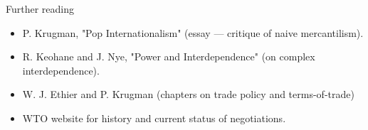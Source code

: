 \documentclass[notes,11pt, aspectratio=169, xcolor=table]{beamer}
\begin{document}
\begin{frame}{Further reading}
  \begin{itemize}
    \item P. Krugman, "Pop Internationalism" (essay — critique of naive mercantilism).
    \item R. Keohane and J. Nye, "Power and Interdependence" (on complex interdependence).
    \item W. J. Ethier and P. Krugman (chapters on trade policy and terms-of-trade)
    \item WTO website for history and current status of negotiations.
  \end{itemize}
\end{frame}
\end{document}
